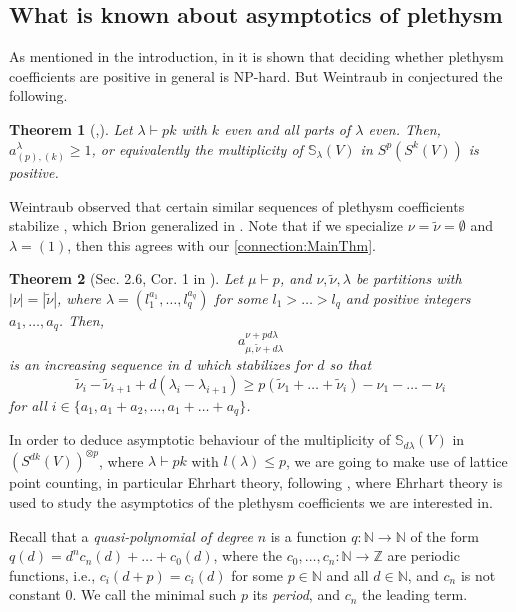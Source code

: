 \documentclass[a4paper]{amsart}
\newtheorem{theorem}{Theorem}
\def\N{{\mathbb{N}}}
\def\Z{{\mathbb{Z}}}
\newcommand{\abs}[1]{\left| #1\right|}
\begin{document}
\subsection{What is known about asymptotics of plethysm}
As mentioned in the introduction, in \cite{FI20} it is shown that deciding whether plethysm coefficients are positive in general is NP-hard.
But Weintraub in \cite[Conj. 2.11]{Wei90} conjectured the following.
\begin{theorem}[{\cite{BCI11},\cite{MM14}}]\label{plethysm:Weintraub}
	Let $\lambda\vdash pk$ with $k$ even and all parts of $\lambda$ even.
Then, $a_{(p),(k)}^\lambda\geq 1$, or equivalently the multiplicity of $\mathbb{S}_\lambda(V)$ in $S^p(S^k(V))$ is positive.
\end{theorem}
Weintraub observed that certain similar sequences of plethysm coefficients stabilize \cite{Wei90},
which Brion generalized in \cite{Bri93}.
Note that if we specialize $\nu=\tilde\nu=\emptyset$ and $\lambda=(1)$,
then this agrees with our \cref{connection:MainThm}.
\begin{theorem}[Sec. 2.6, Cor. 1 in \cite{Bri93}]
	Let $\mu\vdash p$, and $\nu,\tilde\nu,\lambda$ be partitions with $\abs{\nu}=\abs{\tilde\nu}$,
	where $\lambda=\left(l_1^{a_1},\ldots,l_q^{a_q}\right)$ for some $l_1>\ldots>l_q$ and positive integers $a_1,\ldots,a_q$.
	Then,
	\begin{displaymath}
		a_{\mu,\tilde\nu+d\lambda}^{\nu+pd\lambda}
	\end{displaymath}
	is an increasing sequence in $d$ which stabilizes for $d$ so that
	\begin{displaymath}
		\tilde\nu_i-\tilde\nu_{i+1}+d(\lambda_i-\lambda_{i+1})\geq
		p(\tilde\nu_1+\ldots+\tilde\nu_i)-\nu_1-\ldots-\nu_i
	\end{displaymath}
	for all $i\in\{a_1,a_1+a_2,\ldots,a_1+\ldots+a_q\}$.
\end{theorem}
In order to deduce asymptotic behaviour of the multiplicity of $\mathbb{S}_{d\lambda}(V)$ in $(S^{dk}(V))^{\otimes p}$, where $\lambda\vdash pk$ with $l(\lambda)\leq p$,
we are going to make use of lattice point counting, in particular Ehrhart theory, following \cite{KM16},
where Ehrhart theory is used to study the asymptotics of the plethysm coefficients we are interested in.
	
	Recall that a \textit{quasi-polynomial of degree} $n$ is a function $q:\N\to\N$ of the form
$q(d)=d^nc_n(d)+\ldots+c_0(d)$, where the $c_0,\ldots,c_n:\N\to\Z$ are periodic functions, i.e., 
$c_i(d+p)=c_i(d)$ for some $p\in\N$ and all $d\in\N$, and $c_n$ is not constant 0.
We call the minimal such $p$ its \textit{period}, and $c_n$ the leading term.
\end{document}
